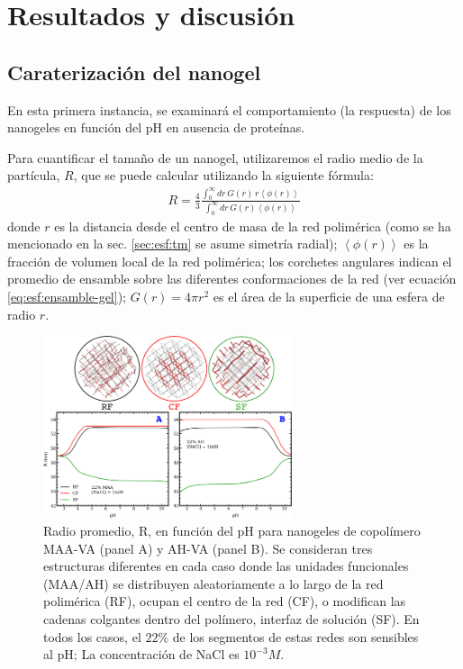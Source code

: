 \section{Resultados y discusi\'on}






\subsection{Caraterizaci\'on del nanogel}

En esta primera instancia, se examinar\'a el comportamiento (la respuesta) de los nanogeles en funci\'on del pH en ausencia de prote\'inas.

Para cuantificar el tama\~no de un nanogel, utilizaremos el radio medio de la part\'icula, $R$, que se puede calcular utilizando la siguiente f\'ormula:
\begin{align}
	R = \frac{4}{3}\frac{\int_0^\infty{dr\,G(r)\,r \left<\phi(r)\right>}}{\int_0^\infty{dr\,G(r)\left<\phi(r)\right>}}
\end{align}
\noindent donde $r$ es la distancia desde el centro de masa de la red polim\'erica (como se ha mencionado en la sec. \ref{sec:esf:tm} se asume simetr\'ia radial);
$\left<\phi(r)\right>$ es la fracci\'on de volumen local de la red polim\'erica;
los corchetes angulares indican el promedio de ensamble sobre las diferentes conformaciones de la red (ver ecuaci\'on \ref{eq:esf:ensamble-gel});
$G(r)=4\pi r^2$ es el \'area de la superficie de una esfera de radio $r$.

\begin{figure}[!htb]
     \centering
     \includegraphics[width=0.65\textwidth]{Figures/graphs-gel2/rr-nano-pH.pdf}
     \caption{Radio promedio, R, en funci\'on del pH para nanogeles de copol\'imero MAA-VA (panel A) y AH-VA (panel B).
     	Se consideran tres estructuras diferentes en cada caso donde las unidades funcionales (MAA/AH) se distribuyen aleatoriamente a lo largo de la red polim\'erica (RF), ocupan el centro de la red (CF), o modifican las cadenas colgantes dentro del pol\'imero, interfaz de soluci\'on (SF).
     	En todos los casos, el $22\%$ de los segmentos de estas redes son sensibles al pH; La concentraci\'on de NaCl es $10^{-3}M$.}
     \label{fig:esf:gel-charge-MAA-AH}
\end{figure}


